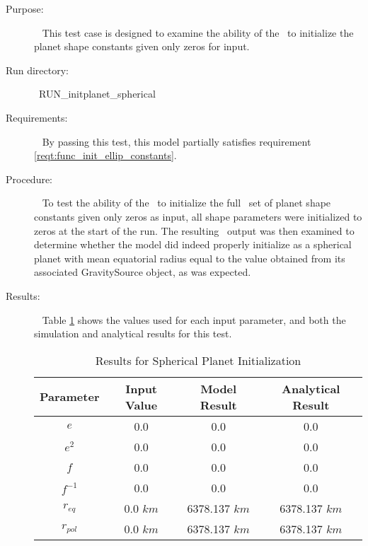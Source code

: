 \label{test:init_spherical}
\begin{description}
\item[Purpose:]\ \newline
This test case is designed to examine the ability of the \planetDesc\ to
initialize the planet shape constants given only zeros for input.
\item[Run directory:]\ \newline  RUN\_initplanet\_spherical
\item[Requirements:]\ \newline
By passing this test, this model partially satisfies requirement
\mbox{\ref{reqt:func_init_ellip_constants}}.

\item[Procedure:]\ \newline
To test the ability of the \planetDesc\ to initialize the full \JEODid\ set of
planet shape constants given only zeros as input, all shape parameters were
initialized to zeros at the start of the run. The resulting \planetDesc\ output
was then examined to determine whether the model did indeed properly initialize
as a spherical planet with mean equatorial radius equal to the value obtained
from its associated GravitySource object, as was expected.

\item[Results:]\ \newline
Table \ref{spherical_init_table} shows the values used for each input parameter,
and both the simulation and analytical results for this test.

\begin{table}[ht]
\begin{center}
\begin{tabular}{|c|c|c|c|}\hline
 Parameter & Input Value & Model Result & Analytical Result \\ \hline
 $e$ & 0.0 & 0.0 & 0.0 \\ \hline
 $e^2$ & 0.0 & 0.0 & 0.0 \\ \hline
 $f$ & 0.0 & 0.0 & 0.0 \\ \hline
 $f^{-1}$ & 0.0 & 0.0 & 0.0 \\ \hline
 $r_{eq}$ & 0.0 $km$ & 6378.137 $km$ & 6378.137 $km$ \\ \hline
 $r_{pol}$ & 0.0 $km$ & 6378.137 $km$ & 6378.137 $km$ \\ \hline
\end{tabular}
\caption{Results for Spherical Planet Initialization}
\label{spherical_init_table}
\end{center}
\end{table}


\end{description}
